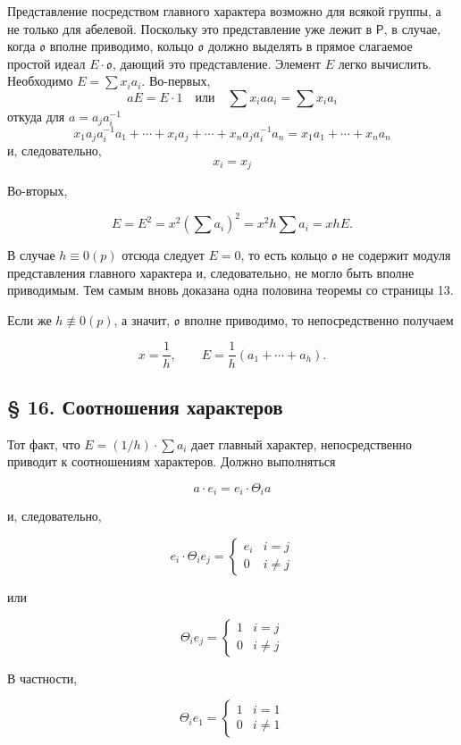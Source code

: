 \documentclass[11pt]{article}
\begin{document}
Представление посредством главного характера возможно для всякой группы, а не только для абелевой. Поскольку это представление уже лежит в \(\mathsf P\), в случае, когда \(\mathfrak o\) вполне приводимо, кольцо \(\mathfrak o\) должно выделять в прямое слагаемое простой идеал \(E\cdot\mathfrak o\), дающий это представление. Элемент \(E\) легко вычислить. Необходимо \(E=\sum x_i a_i\). Во-первых,
\[
aE=E\cdot 1\quad\text{или}\quad \sum x_i a a_i=\sum x_i a_i
\]
откуда для \(a=a_j a_i^{-1}\)
\[
x_1a_ja_i^{-1}a_1+\cdots+x_i a_j+\cdots+x_na_ja_i^{-1}a_n
=x_1a_1+\cdots+x_na_n
\]
и, следовательно,
\[
x_i=x_j
\]

Во-вторых,

\[
E=E^2=x^2\left(\sum a_i\right)^2=x^2h\sum a_i=xhE.
\]

В случае \(h\equiv0(p)\) отсюда следует \(E=0\), то есть кольцо \(\mathfrak o\) не содержит модуля представления главного характера и, следовательно, не могло быть вполне приводимым. Тем самым вновь доказана одна половина теоремы со страницы 13.

Если же \(h\not\equiv0(p)\), а значит, \(\mathfrak o\) вполне приводимо, то непосредственно получаем

\[
x=\frac{1}{h},\qquad E=\frac{1}{h}(a_1+\cdots+a_h).
\]

\subsection*{§ 16. Соотношения характеров}\label{die-charakterenrelationen}

Тот факт, что \(E=(1/h)\cdot\sum a_i\) дает главный характер, непосредственно приводит к соотношениям характеров. Должно выполняться

\[a \cdot e_i = e_i \cdot \Theta_i a\]

и, следовательно,

\[e_i \cdot \Theta_i e_j = \begin{cases} e_i & i = j \\ 0 & i \neq j \end{cases}\]

или

\[\Theta_i e_j = \begin{cases} 1 & i = j \\ 0 & i \neq j \end{cases}\]

В частности,

\[\Theta_i e_1 = \begin{cases} 1 & i = 1 \\ 0 & i \neq 1 \end{cases}\]
\end{document}
